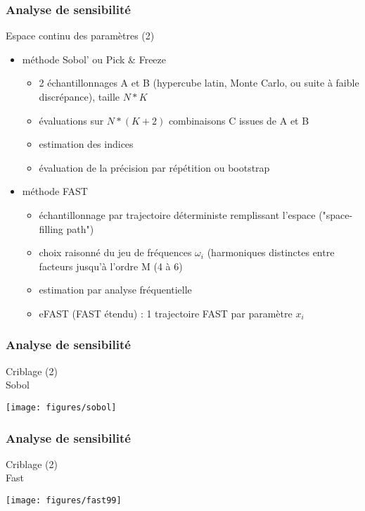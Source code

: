 \documentclass[10pt]{beamer}
\begin{document}
\begin{frame}
\frametitle{Analyse de sensibilité}

\bigskip
\bigskip

Espace continu des paramètres (2)
\bigskip

\begin{itemize}
	\item méthode Sobol' ou Pick \& Freeze
	\begin{itemize}
		\item 2 échantillonnages A et B (hypercube latin, Monte Carlo, ou suite à faible discrépance), taille $ N*K $
		\item évaluations sur $ N*(K+2) $ combinaisons C issues de A et B
		\item estimation des indices
		\item évaluation de la précision par répétition ou bootstrap
	\end{itemize}
	\item méthode FAST
	\begin{itemize}
	\item échantillonnage par trajectoire déterministe remplissant l'espace ("space-filling path")
	\item choix raisonné du jeu de fréquences $ \omega_{i} $ (harmoniques distinctes entre facteurs jusqu'à l'ordre M (4 à 6)
	\item estimation par analyse fréquentielle
	\item eFAST (FAST étendu) : 1 trajectoire FAST par paramètre $ x_{i} $
	\end{itemize}	
\end{itemize}

\end{frame}

\begin{frame}
\frametitle{Analyse de sensibilité}

\bigskip
\bigskip

Criblage (2)
\bigskip
\\
Sobol

\centering
\texttt{[image: figures/sobol]}

\end{frame}

\begin{frame}
\frametitle{Analyse de sensibilité}

\bigskip
\bigskip

Criblage (2)
\bigskip
\\
Fast

\centering
\texttt{[image: figures/fast99]}

\end{frame}
\end{document}
